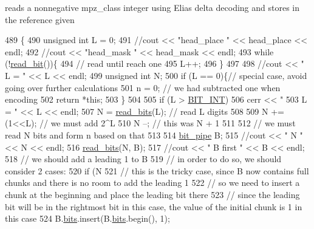 reads a nonnegative mpz\+\_\+class integer using Elias delta decoding and stores in the reference given 


\begin{DoxyCode}
489                                                 \{
490   \textcolor{keywordtype}{unsigned} \textcolor{keywordtype}{int} L = 0;
491   \textcolor{comment}{//cout << "head\_place " << head\_place << endl;}
492   \textcolor{comment}{//cout << "head\_mask  " << head\_mask << endl;}
493   \textcolor{keywordflow}{while} (!\hyperlink{classibitstream_a895239acf7179f6778388c39c97643e4}{read\_bit}())\{
494     \textcolor{comment}{// read until reach one}
495     L++;
496   \}
497 
498   \textcolor{comment}{//cout << " L = " << L << endl;}
499   \textcolor{keywordtype}{unsigned} \textcolor{keywordtype}{int} N;
500   \textcolor{keywordflow}{if} (L == 0)\{\textcolor{comment}{// special case, avoid going over further calculations}
501     n = 0; \textcolor{comment}{// we had subtracted one when encoding }
502     \textcolor{keywordflow}{return} *\textcolor{keyword}{this};
503   \}
504 
505   \textcolor{keywordflow}{if} (L > \hyperlink{bitstream_8h_afcadf5aa65c5159bfb96c4d82ebc0a5d}{BIT\_INT})
506     cerr << \textcolor{stringliteral}{" 503 L = "} << L << endl;
507   N = \hyperlink{classibitstream_a2fdcaecf10fefa6942dcd5286a2696e0}{read\_bits}(L); \textcolor{comment}{// read L digits}
508   
509   N += (1<<L); \textcolor{comment}{// we must add 2^L}
510   N --; \textcolor{comment}{// this was N + 1}
511 
512   \textcolor{comment}{// we must read N bits and form n based on that}
513 
514   \hyperlink{classbit__pipe}{bit\_pipe} B;
515   \textcolor{comment}{//cout << " N " << N << endl;}
516   \hyperlink{classibitstream_a2fdcaecf10fefa6942dcd5286a2696e0}{read\_bits}(N, B);
517   \textcolor{comment}{//cout << " B first " << B << endl;}
518   \textcolor{comment}{// we should add a leading 1 to B}
519   \textcolor{comment}{// in order to do so, we should consider 2 cases:}
520   \textcolor{keywordflow}{if} (N %
521     \textcolor{comment}{// this is the tricky case, since B now contains full chunks and there is no room to add the leading 1}
522     \textcolor{comment}{// so we need to insert a chunk at the beginning and place the leading bit there}
523     \textcolor{comment}{// since the leading bit will be in the rightmost bit in this case, the value of the initial chunk is 1
       in this case}
524     B.\hyperlink{classbit__pipe_a86f38af1e9736b053728033490476b50}{bits}.insert(B.\hyperlink{classbit__pipe_a86f38af1e9736b053728033490476b50}{bits}.begin(), 1);

\end{DoxyCode}
